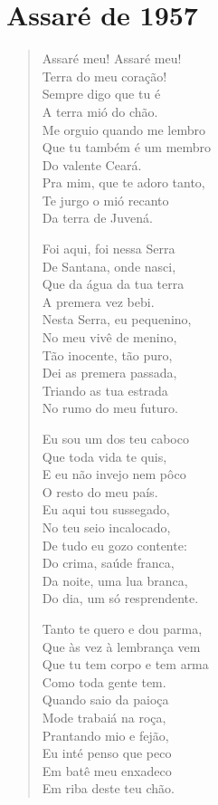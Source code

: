 \chapter{Assaré de 1957}

\begin{verse}
Assaré meu! Assaré meu!\\
Terra do meu coração!\\
Sempre digo que tu é\\
A terra mió do chão.\\
Me orguio quando me lembro\\
Que tu também é um membro\\
Do valente Ceará.\\
Pra mim, que te adoro tanto,\\
Te jurgo o mió recanto\\
Da terra de Juvená.

Foi aqui, foi nessa Serra\\
De Santana, onde nasci,\\
Que da água da tua terra\\
A premera vez bebi.\\
Nesta Serra, eu pequenino,\\
No meu vivê de menino,\\
Tão inocente, tão puro,\\
Dei as premera passada,\\
Triando as tua estrada\\
No rumo do meu futuro.

Eu sou um dos teu caboco\\
Que toda vida te quis,\\
E eu não invejo nem pôco\\
O resto do meu país.\\
Eu aqui tou sussegado,\\
No teu seio incalocado,\\
De tudo eu gozo contente:\\
Do crima, saúde franca,\\
Da noite, uma lua branca,\\
Do dia, um só resprendente.

Tanto te quero e dou parma,\\
Que às vez à lembrança vem\\
Que tu tem corpo e tem arma\\
Como toda gente tem.\\
Quando saio da paioça\\
Mode trabaiá na roça,\\
Prantando mio e fejão,\\
Eu inté penso que peco\\
Em batê meu enxadeco\\
Em riba deste teu chão.


\end{verse}
